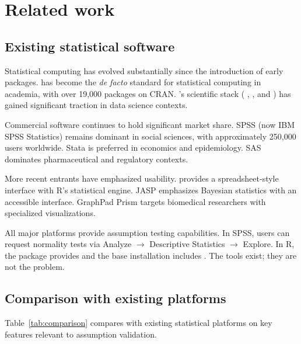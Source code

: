 \documentclass[article]{jss}
\begin{document}

\section{Related work} \label{sec:related}

\subsection{Existing statistical software}

Statistical computing has evolved substantially since the introduction of early packages.  \citep{rcore2023} has become the \emph{de facto} standard for statistical computing in academia, with over 19,000 packages on CRAN. 's scientific stack ( \citep{harris2020numpy},  \citep{virtanen2020scipy}, and  \citep{seabold2010statsmodels}) has gained significant traction in data science contexts.

Commercial software continues to hold significant market share. SPSS (now IBM SPSS Statistics) remains dominant in social sciences, with approximately 250,000 users worldwide. Stata is preferred in economics and epidemiology. SAS dominates pharmaceutical and regulatory contexts.

More recent entrants have emphasized usability.  \citep{jamovi2023} provides a spreadsheet-style interface with R's statistical engine. JASP \citep{jasp2023} emphasizes Bayesian statistics with an accessible interface. GraphPad Prism targets biomedical researchers with specialized visualizations.

All major platforms provide assumption testing capabilities. In SPSS, users can request normality tests via Analyze $\rightarrow$ Descriptive Statistics $\rightarrow$ Explore. In R, the  package \citep{fox2019car} provides  and the base installation includes . The tools exist; they are not the problem.

\subsection{Comparison with existing platforms}

Table~\ref{tab:comparison} compares  with existing statistical platforms on key features relevant to assumption validation.
\end{document}
